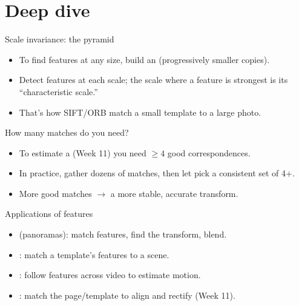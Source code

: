 \documentclass[10pt,aspectratio=169]{beamer}
\begin{document}
\section{Deep dive}

\begin{frame}{Scale invariance: the pyramid}
  \begin{itemize}
    \item To find features at any size, build an  (progressively smaller copies).
    \item Detect features at each scale; the scale where a feature is strongest is its ``characteristic scale.''
    \item That's how SIFT/ORB match a small template to a large photo.
  \end{itemize}
\end{frame}

\begin{frame}{How many matches do you need?}
  \begin{itemize}
    \item To estimate a  (Week 11) you need $\geq 4$ good correspondences.
    \item In practice, gather dozens of matches, then let  pick a consistent set of 4+.
    \item More good matches $\rightarrow$ a more stable, accurate transform.
  \end{itemize}
\end{frame}

\begin{frame}{Applications of features}
  \begin{itemize}
    \item {} (panoramas): match features, find the transform, blend.
    \item {}: match a template's features to a scene.
    \item {}: follow features across video to estimate motion.
    \item {}: match the page/template to align and rectify (Week 11).
  \end{itemize}
\end{frame}
\end{document}
